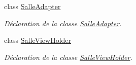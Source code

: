 \begin{DoxyCompactItemize}
class \hyperlink{classcom_1_1lasalle_1_1meeting_1_1_salle_adapter}{Salle\+Adapter}
\begin{DoxyCompactList}\small\item\em Déclaration de la classe \hyperlink{classcom_1_1lasalle_1_1meeting_1_1_salle_adapter}{Salle\+Adapter}. \end{DoxyCompactList}\item 
class \hyperlink{classcom_1_1lasalle_1_1meeting_1_1_salle_view_holder}{Salle\+View\+Holder}
\begin{DoxyCompactList}\small\item\em Déclaration de la classe \hyperlink{classcom_1_1lasalle_1_1meeting_1_1_salle_view_holder}{Salle\+View\+Holder}. \end{DoxyCompactList}\end{DoxyCompactItemize}
